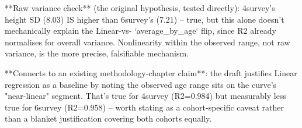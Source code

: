**Raw variance check** (the original hypothesis, tested directly): 4survey's height SD (8.03) IS
higher than 6survey's (7.21) -- true, but this alone doesn't mechanically explain the Linear-vs-
`average_by_age` flip, since R2 already normalises for overall variance. Nonlinearity within the
observed range, not raw variance, is the more precise, falsifiable mechanism.

**Connects to an existing methodology-chapter claim**: the draft justifies Linear regression as a
baseline by noting the observed age range sits on the curve's "near-linear" segment. That's true
for 4survey (R2=0.984) but measurably less true for 6survey (R2=0.958) -- worth stating as a
cohort-specific caveat rather than a blanket justification covering both cohorts equally.
